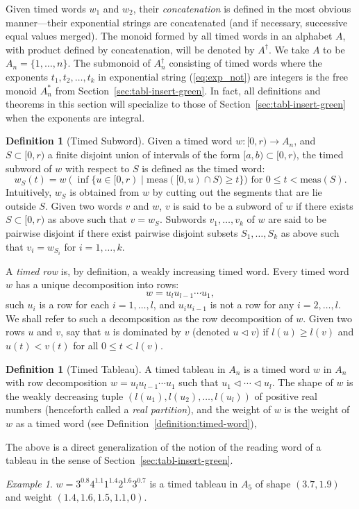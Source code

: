\documentclass[10pt]{amsproc}
\theoremstyle{definition}
\newtheorem{definition}[theorem]{Definition}
\theoremstyle{remark}
\newtheorem{example}[theorem]{Example}
\begin{document}
Given timed words $w_1$ and $w_2$, their \emph{concatenation} is defined in the most obvious manner---their exponential strings are concatenated (and if necessary, successive equal values merged).
The monoid formed by all timed words in an alphabet $A$, with product defined by concatenation, will be denoted by $A^\dagger$.
We take $A$ to be $A_n=\{1,\dotsc,n\}$.
The submonoid of $A_n^\dagger$ consisting of timed words where the exponents $t_1,t_2,\dotsc,t_k$ in exponential string (\ref{eq:exp_not}) are integers is the free monoid $A_n^*$ from Section~\ref{sec:tabl-insert-green}.
In fact, all definitions and theorems in this section will specialize to those of Section~\ref{sec:tabl-insert-green} when the exponents are integral.

\begin{definition}
  [Timed Subword]
  \label{definition:timed-subword}
  Given a timed word $w:[0,r)\to A_n$, and $S\subset [0,r)$ a finite disjoint union of intervals of the form $[a, b)\subset [0,r)$, the timed subword of $w$ with respect to $S$ is defined as the timed word:
  \begin{displaymath}
    w_S(t) = w(\inf\{u\in [0,r)\mid \mathrm{meas}([0,u)\cap S) \geq t\}) \text{ for } 0\leq t < \mathrm{meas}(S).
  \end{displaymath}
  Intuitively, $w_S$ is obtained from $w$ by cutting out the segments that are lie outside $S$.
  Given two words $v$ and $w$, $v$ is said to be a subword of $w$ if there exists $S\subset [0,r)$ as above such that $v=w_S$.
  Subwords $v_1,\dotsc,v_k$ of $w$ are said to be pairwise disjoint if there exist pairwise disjoint subsets $S_1,\dotsc,S_k$ as above such that $v_i=w_{S_i}$ for $i=1,\dotsc,k$.
\end{definition}

A \emph{timed row} is, by definition, a weakly increasing timed word.
Every timed word $w$ has a unique decomposition into rows:
\begin{displaymath}
  w = u_l u_{l-1}\dotsb u_1,
\end{displaymath}
such $u_i$ is a row for each $i=1,\dotsc,l$, and $u_iu_{i-1}$ is not a row for any $i=2,\dotsc,l$.
We shall refer to such a decomposition as the row decomposition of $w$.
Given two rows $u$ and $v$, say that $u$ is dominated by $v$ (denoted $u\lhd v$) if $l(u)\geq l(v)$ and $u(t)<v(t)$ for all $0\leq t<l(v)$.
\begin{definition}[Timed Tableau]\label{definition:timed-tableau}
  A timed tableau in $A_n$ is a timed word $w$ in $A_n$ with row decomposition $w=u_l u_{l-1}\dotsb u_1$ such that $u_1\lhd \dotsb \lhd u_l$.
  The shape of $w$ is the weakly decreasing tuple $(l(u_1),l(u_2),\dotsc,l(u_l))$ of positive real numbers (henceforth called a \emph{real partition}), and the weight of $w$ is the weight of $w$ as a timed word (see Definition~\ref{definition:timed-word}),
\end{definition}
The above is a direct generalization of the notion of the reading word of a tableau in the sense of Section~\ref{sec:tabl-insert-green}.
\begin{example}
  \label{example:timed-tableau}
  $w=3^{0.8}4^{1.1}1^{1.4}2^{1.6}3^{0.7}$ is a timed tableau in $A_5$ of shape $(3.7,1.9)$ and weight $(1.4, 1.6, 1.5, 1.1,0)$.
\end{example}
\end{document}
